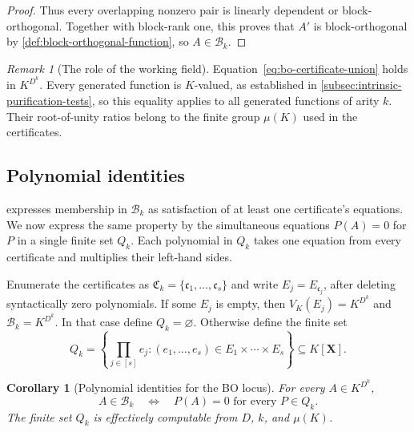 \documentclass[11pt,letterpaper,onecolumn]{article}
\theoremstyle{plain}
\newtheorem{corollary}[corollary]{Corollary}
\theoremstyle{definition}
\theoremstyle{remark}
\newtheorem{remark}[remark]{Remark}
\begin{document}
\begin{proof}
Thus every overlapping nonzero pair is linearly dependent or
block-orthogonal.  Together with block-rank one, this proves that $A'$ is
block-orthogonal by \cref{def:block-orthogonal-function}, so
$A\in\mathcal B_k$.
\end{proof}

\begin{remark}[The role of the working field]
\label{rem:bo-certificates-k-points}
Equation~\eqref{eq:bo-certificate-union} holds in $K^{D^k}$.  Every
generated function is $K$-valued, as established in
\cref{subsec:intrinsic-purification-tests}, so this equality applies to
all generated functions of arity $k$.  Their root-of-unity ratios belong
to the finite group $\mu(K)$ used in the certificates.
\end{remark}

\subsection{Polynomial identities}

 expresses membership in $\mathcal B_k$
as satisfaction of at least one certificate's equations.  We now express
the same property by the simultaneous equations $P(A)=0$ for $P$ in a
single finite set $Q_k$.  Each polynomial in $Q_k$ takes one equation from every
certificate and multiplies their left-hand sides.

Enumerate the certificates as $\mathfrak C_k=\{\mathfrak c_1,\ldots,\mathfrak c_s\}$ and write $E_j=E_{\mathfrak c_j}$, after deleting syntactically zero
polynomials.  If some $E_j$ is empty, then
$V_K(E_j)=K^{D^k}$ and $\mathcal B_k=K^{D^k}$. In that case define
$Q_k=\varnothing$.  Otherwise define the finite set
\begin{equation*}
  Q_k=
  \left\{
    \prod_{j\in[s]} e_j:
    (e_1,\ldots,e_s)\in E_1\times\cdots\times E_s
  \right\}
  \subseteq K[\mathbf X].
\end{equation*}

\begin{corollary}[Polynomial identities for the BO locus]
\label{cor:bo-product-identities}
For every $A\in K^{D^k}$,
\begin{equation}
  A\in\mathcal B_k
  \quad\Longleftrightarrow\quad
  P(A)=0\text{ for every }P\in Q_k.
  \label{eq:bo-locus-by-identities}
\end{equation}
The finite set $Q_k$ is effectively computable from $D$, $k$, and $\mu(K)$.
\end{corollary}
\end{document}
